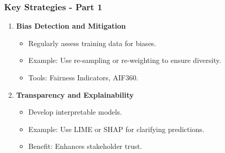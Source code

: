 \documentclass{beamer}
\begin{document}
\begin{frame}[fragile]
    \frametitle{Key Strategies - Part 1}
    \begin{enumerate}
        \item \textbf{Bias Detection and Mitigation}
        \begin{itemize}
            \item Regularly assess training data for biases.
            \item Example: Use re-sampling or re-weighting to ensure diversity.
            \item Tools: Fairness Indicators, AIF360.
        \end{itemize}

        \item \textbf{Transparency and Explainability}
        \begin{itemize}
            \item Develop interpretable models.
            \item Example: Use LIME or SHAP for clarifying predictions.
            \item Benefit: Enhances stakeholder trust.
        \end{itemize}
    \end{enumerate}
\end{frame}
\end{document}
